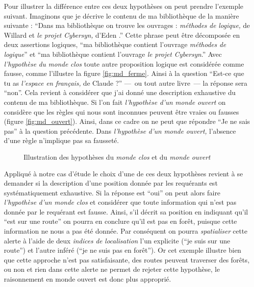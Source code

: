 Pour illustrer la différence entre ces deux hypothèses on peut prendre
l'exemple suivant. Imaginons que je décrive le contenu de ma
bibliothèque de la manière suivante : \enquote{Dans ma bibliothèque on
  trouve les ouvrages : \emph{méthodes de logique,} de Willard
   et \emph{le projet \emph{Cybersyn},} d'Eden
  .} Cette phrase peut être décomposée en deux assertions
logiques, \enquote{ma bibliothèque contient l'ouvrage \emph{méthodes
    de logique}} et \enquote{ma bibliothèque contient l'ouvrage
  \emph{le projet \emph{Cybersyn}}.} Avec \emph{l'hypothèse du monde
  clos} toute autre proposition logique est considérée comme fausse,
comme l'illustre la figure \ref{fig:md_ferme}. Ainsi à la question
\enquote{Est-ce que tu as \emph{l'espace en français,} de Claude
   ?} ---~ou tout autre livre~--- la réponse sera
\enquote{non}. Cela revient à considérer que j'ai donné une
description exhaustive du contenu de ma bibliothèque. Si l'on fait
\emph{l'hypothèse d'un monde ouvert} on considère que les règles qui
nous sont inconnues peuvent être vraies ou fausses (figure
\ref{fig:md_ouvert}). Ainsi, dans ce cadre on ne peut que répondre
\enquote{Je ne sais pas} à la question précédente. Dans
\emph{l'hypothèse d'un monde ouvert,} l’absence d'une règle n'implique
pas sa fausseté.

\begin{figure}
  \centering
  \subfloat[]{
    
    \label{fig:md_ferme}
  }\hspace{2cm}
  \subfloat[]{
    
    \label{fig:md_ouvert}
  }
  \caption{Illustration des hypothèses du \emph{monde clos}
    \protect{} et du \emph{monde ouvert}
    \protect{}}
  \label{fig:comp_md}
\end{figure}

Appliqué à notre cas d'étude le choix d'une de ces deux hypothèses
revient à se demander si la description d'une position donnée par les
requérants est systématiquement exhaustive. Si la réponse est
\enquote{oui} on peut alors faire \emph{l'hypothèse d'un monde clos}
et considérer que toute information qui n'est pas donnée par le
requérant est fausse. Ainsi, s'il décrit sa position en indiquant
qu'il \enquote{est sur une route} on pourra en conclure qu'il est pas
en forêt, puisque cette information ne nous a pas été donnée. Par
conséquent on pourra \emph{spatialiser} cette alerte à l'aide de deux
\emph{indices de localisation} l'un explicite (\enquote{je suis sur
  une route}) et l'autre inféré (\enquote{je ne suis pas en
  forêt}). Or cet exemple illustre bien que cette approche n'est pas
satisfaisante, des routes peuvent traverser des forêts, ou non et rien
dans cette alerte ne permet de rejeter cette hypothèse, le
raisonnement en monde ouvert est donc plus approprié.

